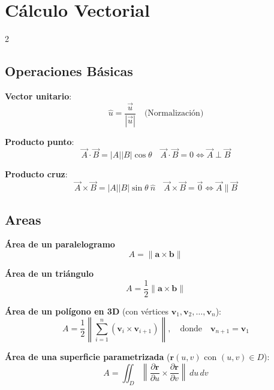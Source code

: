               \section{Cálculo Vectorial}
              \begin{multicols}{2}

                \subsection*{Operaciones Básicas}
                \begin{itemform}[leftmargin=*,noitemsep,topsep=0pt]
                \item \textbf{Vector unitario}:
                  $$\hat{u} = \frac{\vec{u}}{|\vec{u}|} \quad \text{(Normalización)}$$
                \item \textbf{Producto punto}:
                  $$\vec{A} \cdot \vec{B} = |A||B|\cos\theta \quad \vec{A} \cdot \vec{B} = 0 \iff \vec{A} \perp \vec{B} $$
                \item \textbf{Producto cruz}:
                  $$\vec{A} \times \vec{B} = |A||B|\sin\theta\ \hat{n} \quad \vec{A} \times \vec{B} = \vec{0} \iff \vec{A} \parallel \vec{B}$$
                \end{itemform}

                \subsection*{Areas}
                \begin{itemform}

                \item \textbf{Área de un paralelogramo}
                  \[
                    A = \|\mathbf{a} \times \mathbf{b}\|
                  \]

                \item \textbf{Área de un triángulo}
                  \[
                    A = \frac{1}{2} \|\mathbf{a} \times \mathbf{b}\|
                  \]

                \item \textbf{Área de un polígono en 3D} (con vértices $\mathbf{v}_1, \mathbf{v}_2, \dots, \mathbf{v}_n$):
                  \[
                    A = \frac{1}{2} \left\| \sum_{i=1}^n (\mathbf{v}_i \times \mathbf{v}_{i+1}) \right\|, \quad \text{donde} \quad \mathbf{v}_{n+1} = \mathbf{v}_1
                  \]

                \item \textbf{Área de una superficie parametrizada} ($\mathbf{r}(u,v)$ con $(u,v) \in D$):
                  \[
                    A = \iint_D \left\| \frac{\partial \mathbf{r}}{\partial u} \times \frac{\partial \mathbf{r}}{\partial v} \right\| \, du \, dv
                  \]


\end{itemform}
\end{multicols}
